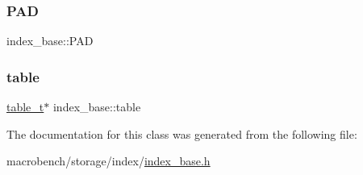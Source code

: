 \mbox{\label{classindex__base_aecdbc18775b6db4572392085e82e12d2}} 
\subsubsection{\texorpdfstring{P\+AD}{PAD}}
{\footnotesize\ttfamily index\+\_\+base\+::\+P\+AD\hspace{0.3cm}{\ttfamily [protected]}}

\mbox{\label{classindex__base_abb51a82fc0bf85a82aa83376d111641f}} 
\subsubsection{\texorpdfstring{table}{table}}
{\footnotesize\ttfamily \hyperlink{classtable__t}{table\+\_\+t}$\ast$ index\+\_\+base\+::table\hspace{0.3cm}{\ttfamily [protected]}}



The documentation for this class was generated from the following file\+:\begin{DoxyCompactItemize}
\item 
macrobench/storage/index/\hyperlink{index__base_8h}{index\+\_\+base.\+h}\end{DoxyCompactItemize}

